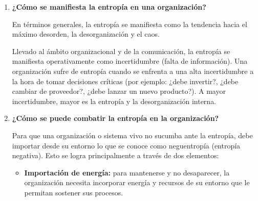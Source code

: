 \documentclass[12pt,a4paper]{article}
\begin{document}
\begin{enumerate}[label=\textbf{Pregunta \arabic*.}]
\begin{enumerate}
\begin{itemize}
                        \item \textbf{El sistema cerrado termodinámico:} por otro lado, la física define a un sistema cerrado como aquel que no intercambia materia, energía ni información con su entorno. Es a este tipo de sistemas al que se le aplica de forma estricta la Segunda Ley de la Termodinámica, la cual dicta que su entropía (desorden) aumentará irremediablemente hasta llegar a su fin.
                    \end{itemize}

                    Las organizaciones (y los seres vivos) son en realidad sistemas abiertos, ya que necesitan importar constantemente recursos de su medio para sobrevivir. Lejos de estar destinados a desaparecer, utilizar el mecanismo de retroalimentación (el ``circuito cerrado'' de Forrester) es la herramienta fundamental que les permite ajustar su comportamiento, mantener su estabilidad y evitar su destrucción.

              \item \textbf{¿Cómo se manifiesta la entropía en una organización?}

                    En términos generales, la entropía se manifiesta como la tendencia hacia el máximo desorden, la desorganización y el caos.

                    Llevado al ámbito organizacional y de la comunicación, la entropía se manifiesta operativamente como incertidumbre (falta de información). Una organización sufre de entropía cuando se enfrenta a una alta incertidumbre a la hora de tomar decisiones críticas (por ejemplo: ¿debe invertir?, ¿debe cambiar de proveedor?, ¿debe lanzar un nuevo producto?). A mayor incertidumbre, mayor es la entropía y la desorganización interna.

              \item \textbf{¿Cómo se puede combatir la entropía en la organización?}

                    Para que una organización o sistema vivo no sucumba ante la entropía, debe importar desde su entorno lo que se conoce como neguentropía (entropía negativa). Esto se logra principalmente a través de dos elementos:

                    \begin{itemize}
                        \item \textbf{Importación de energía:} para mantenerse y no desaparecer, la organización necesita incorporar energía y recursos de su entorno que le permitan sostener sus procesos.


\end{itemize}
\end{enumerate}
\end{enumerate}
\end{document}
